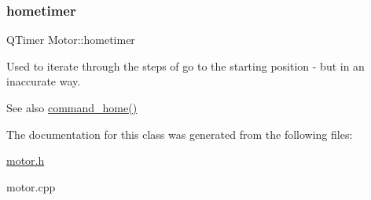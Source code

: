\subsubsection{\texorpdfstring{hometimer}{hometimer}}
{\footnotesize\ttfamily Q\+Timer Motor\+::hometimer\hspace{0.3cm}{\ttfamily [private]}}



Used to iterate through the steps of \textquotesingle{}go to the starting position\textquotesingle{} -\/ but in an inaccurate way. 

\begin{DoxySeeAlso}{See also}
\hyperlink{classMotor_a75c8443fde45f5dc88e7bfe12db75a88}{command\+\_\+home()} 
\end{DoxySeeAlso}


The documentation for this class was generated from the following files\+:\begin{DoxyCompactItemize}
\item 
\hyperlink{motor_8h}{motor.\+h}\item 
motor.\+cpp\end{DoxyCompactItemize}

